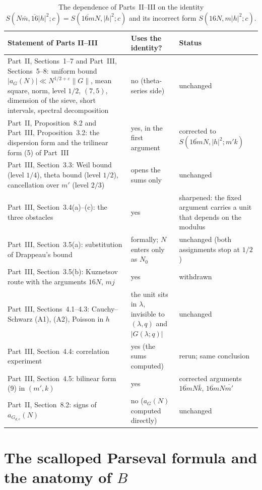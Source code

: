 \documentclass[11pt]{amsart}
\theoremstyle{remark}
\newcommand{\e}{\varepsilon}
\begin{document}
\begin{table}[htbp]
\centering\footnotesize
\begin{tabular}{R{0.46\textwidth}R{0.2\textwidth}R{0.27\textwidth}}
\toprule
Statement of Parts II--III & Uses the identity? & Status\\
\midrule
Part~II, Sections~1--7 and Part~III, Sections~5--8: uniform bound $|a_G(N)|\ll N^{1/2+\e}\|G\|$, mean square, norm, level $1/2$, $(7,5)$, dimension of the sieve, short intervals, spectral decomposition & no (theta-series side) & unchanged\\
Part~II, Proposition~8.2 and Part~III, Proposition~3.2: the dispersion form and the trilinear form (5) of Part~III & yes, in the first argument & corrected to $S(\overline{16m}N,|h|^2;m'k)$\\
Part~III, Section~3.3: Weil bound (level $1/4$), theta bound (level $1/2$), cancellation over $m'$ (level $2/3$) & opens the sums only & unchanged\\
Part~III, Section~3.4(a)--(c): the three obstacles & yes & sharpened: the fixed argument carries a unit that depends on the modulus\\
Part~III, Section~3.5(a): substitution of Drappeau's bound \cite{Drappeau} & formally; $N$ enters only as $N_0$ & unchanged (both assignments stop at $1/2$)\\
Part~III, Section~3.5(b): Kuznetsov route \cite{DI} with the arguments $16N$, $mj$ & yes & withdrawn\\
Part~III, Sections~4.1--4.3: Cauchy--Schwarz (A1), (A2), Poisson in $h$ & the unit sits in $\lambda$, invisible to $(\lambda,q)$ and $|G(\lambda;q)|$ & unchanged\\
Part~III, Section~4.4: correlation experiment & yes (the sums computed) & rerun; same conclusion\\
Part~III, Section~4.5: bilinear form (9) in $(m',k)$ & yes & corrected arguments $\overline{16m}N\bar k$, $\overline{16m}N\overline{m'}$\\
Part~II, Section~8.2: signs of $a_{G_{d,e}}(N)$ & no ($a_G(N)$ computed directly) & unchanged\\
\bottomrule
\end{tabular}
\medskip
\caption{The dependence of Parts~II--III on the identity $S(N\bar m,\overline{16}|h|^2;c)=S(\overline{16m}N,|h|^2;c)$ and its incorrect form $S(16N,m|h|^2;c)$.}
\label{tab:audit}
\end{table}

\section{The scalloped Parseval formula and the anatomy of \texorpdfstring{$B$}{B}}\label{sec:scallop}
\end{document}
